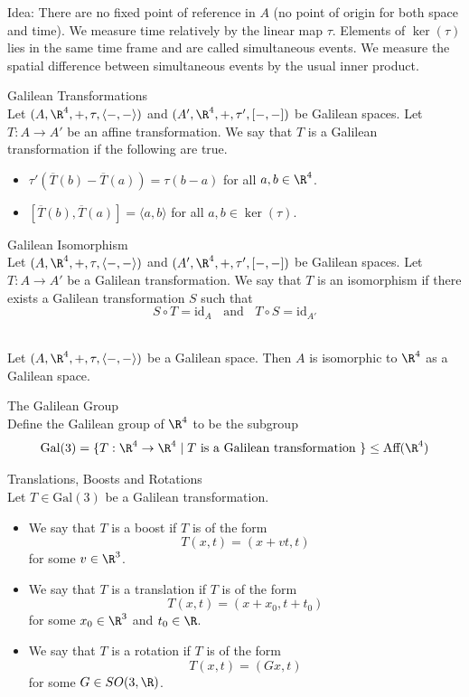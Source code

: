 \documentclass[a4paper]{article}
\begin{document}
Idea: There are no fixed point of reference in $A$ (no point of origin for both space and time). We measure time relatively by the linear map $\tau$. Elements of $\ker(\tau)$ lies in the same time frame and are called simultaneous events. We measure the spatial difference between simultaneous events by the usual inner product. 

\begin{defn}{Galilean Transformations}{}\\
Let $(A,\R^4,+,\tau,\langle-,-\rangle)$ and $(A',\R^4,+,\tau',[-,-])$ be Galilean spaces. Let $T:A\to A'$ be an affine transformation. We say that $T$ is a Galilean transformation if the following are true. 
\begin{itemize}
\item $\tau'(\overline{T}(b)-\overline{T}(a))=\tau(b-a)$ for all $a,b\in\R^4$. 
\item $[\overline{T}(b),\overline{T}(a)]=\langle a,b\rangle$ for all $a,b\in\ker(\tau)$. 
\end{itemize}
\end{defn}

\begin{defn}{Galilean Isomorphism}{}\\
Let $(A,\R^4,+,\tau,\langle-,-\rangle)$ and $(A',\R^4,+,\tau',[-,-])$ be Galilean spaces. Let $T:A\to A'$ be a Galilean transformation. We say that $T$ is an isomorphism if there exists a Galilean transformation $S$ such that $$S\circ T=\text{id}_A\;\;\text{ and }\;\;T\circ S=\text{id}_{A'}$$
\end{defn}

\begin{prp}{}{}\\
Let $(A,\R^4,+,\tau,\langle-,-\rangle)$ be a Galilean space. Then $A$ is isomorphic to $\R^4$ as a Galilean space. 
\end{prp}

\begin{defn}{The Galilean Group}{}\\
Define the Galilean group of $\R^4$ to be the subgroup $$\text{Gal}(3)=\{T:\R^4\to\R^4\;|\;T\text{ is a Galilean transformation }\}\leq\text{Aff}(\R^4)$$
\end{defn}

\begin{defn}{Translations, Boosts and Rotations}{}\\
Let $T\in\text{Gal}(3)$ be a Galilean transformation. 
\begin{itemize}
\item We say that $T$ is a boost if $T$ is of the form $$T(x,t)=(x+vt,t)$$ for some $v\in\R^3$. 
\item We say that $T$ is a translation if $T$ is of the form $$T(x,t)=(x+x_0,t+t_0)$$ for some $x_0\in\R^3$ and $t_0\in\R$. 
\item We say that $T$ is a rotation if $T$ is of the form $$T(x,t)=(Gx,t)$$ for some $G\in SO(3,\R)$. 
\end{itemize}
\end{defn}
\end{document}

